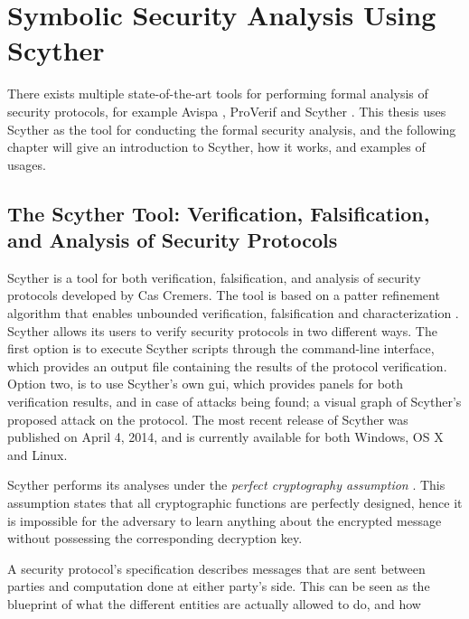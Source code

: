 \chapter{Symbolic Security Analysis Using Scyther}
\label{chp:scyther} 


There exists multiple state-of-the-art tools for performing formal analysis of security protocols, for example Avispa \cite{avispa}, ProVerif \cite{proverif} and Scyther \cite{scyther}. This thesis uses Scyther as the tool for conducting the formal security analysis, and the following chapter will give an introduction to Scyther, how it works, and examples of usages.


\section{The Scyther Tool: Verification, Falsification, and Analysis of Security Protocols}

Scyther is a tool for both verification, falsification, and analysis of security protocols developed by Cas Cremers. The tool is based on a patter refinement algorithm that enables unbounded verification, falsification and characterization \cite{cremers2008scyther}. Scyther allows its users to verify security protocols in two different ways. The first option is to execute Scyther scripts through the command-line interface, which provides an output file containing the results of the protocol verification. Option two, is to use Scyther's own \gls{gui}, which provides panels for both verification results, and in case of attacks being found; a visual graph of Scyther's proposed attack on the protocol. The most recent release of Scyther was published on April 4, 2014, and is currently available for both Windows, OS X and Linux.


Scyther performs its analyses under the \emph{perfect cryptography assumption} \cite{cremers2008unbounded}. This assumption states that all cryptographic functions are perfectly designed, hence it is impossible for the adversary to learn anything about the encrypted message without possessing the corresponding decryption key.


A security protocol's specification describes messages that are sent between parties and computation done at either party's side. This can be seen as the blueprint of what the different entities are actually allowed to do, and how  

